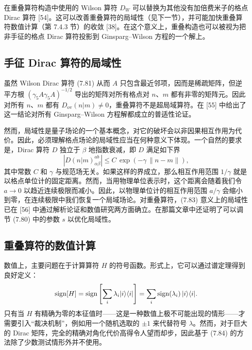 在重叠算符构造中使用的 Wilson 算符 $D_W$ 可以替换为其他没有加倍费米子的格点 Dirac 算符 [54]。这可以改善重叠算符的局域性（见下一节），并可能加快重叠算符数值计算（第 7.4.3 节）的收敛 [38]。在这个意义上，重叠构造也可以被视为把非手征的格点 Dirac 算符投影到 Ginsparg--Wilson 方程的一个解上。

\subsection{手征 Dirac 算符的局域性}

虽然 Wilson Dirac 算符 (7.81) 从而 $A$ 只包含最近邻项，因而是稀疏矩阵，但逆平方根 $(\gamma_5 A\gamma_5 A)^{-1/2}$ 导出的矩阵对所有格点对 $n$、$m$ 都有非零的矩阵元。因此对所有 $n$、$m$ 都有 $D_{\mathrm{ov}}(n|m) \neq 0$，重叠算符不是超局域算符。在 [55] 中给出了这一结论对所有 Ginsparg--Wilson 方程解都成立的普适性论证。

然而，局域性是量子场论的一个基本概念，对它的破坏会以非因果相互作用为代价。因此，必须理解格点场论的局域性应当在何种意义下体现。一个自然的要求是，Dirac 算符 $D$ 独立于 $\beta$ 地指数衰减，即 $D$ 满足如下界
\begin{equation}
  \left|D(n|m)^{ab}_{\alpha\beta}\right| \leq C\,\exp\left(-\gamma\,\|n-m\|\right),
\end{equation}
其中常数 $C$ 和 $\gamma$ 与规范场无关。如果这样的界成立，那么相互作用范围 $1/\gamma$ 就是以格点单位计的固定距离。然而，当用物理单位表示时，这个距离会随着我们令 $a \to 0$ 以趋近连续极限而减小。因此，以物理单位计的相互作用范围 $a/\gamma$ 会缩小到零，在连续极限中我们恢复一个局域场论。对重叠算符，(7.83) 意义上的局域性已在 [56] 中通过解析论证和数值研究两方面确立。在那篇文章中还证明了可以调节 (7.80) 中的参数 $s$ 以优化局域性。

\subsection{重叠算符的数值计算}

数值上，主要问题在于计算算符 $H$ 的符号函数。形式上，它可以通过谱定理得到良好定义：
\begin{equation}
  \mathrm{sign}[H] = \mathrm{sign}\left[\sum_i \lambda_i |i\rangle\langle i|\right]
  = \sum_i \mathrm{sign}(\lambda_i)\,|i\rangle\langle i| .
\end{equation}
只有当 $H$ 有精确为零的本征值时——这是一种数值上极不可能出现的情形——才需要引入``裁决机制''，例如用一个随机选取的 $\pm 1$ 来代替符号 $\lambda$。然而，对于巨大的 Dirac 矩阵，完全的精确对角化代价高得令人望而却步，因此基于 (7.84) 的方法除了少数测试情形外并不使用。

